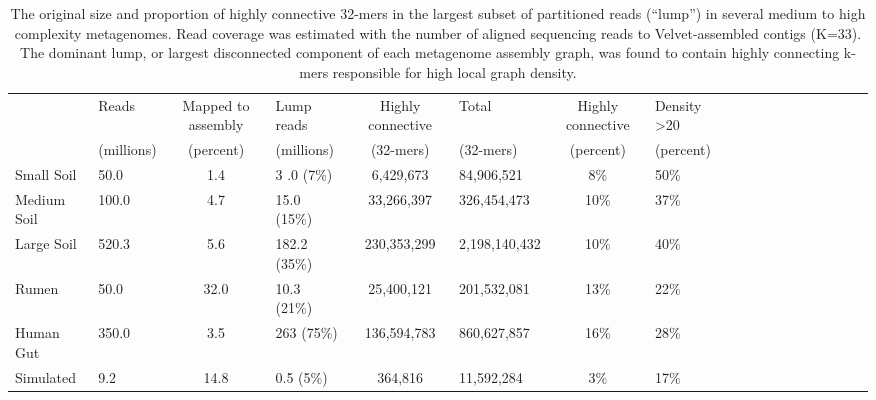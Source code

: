 \documentclass[10pt]{article}
\begin{document}



\pagebreak

\begin{landscape}
\begin{table}[ht]
\centering
\caption{The original size and proportion of highly connective 32-mers in the largest subset of partitioned reads (``lump'') in several medium to high complexity metagenomes.  Read coverage was estimated with the number of aligned sequencing reads to Velvet-assembled contigs (K=33).  The dominant lump, or largest disconnected component of each metagenome assembly graph, was found to contain highly connecting k-mers responsible for high local graph density.}
\begin{tabular}{lp{2cm}cp{2cm}cp{2cm}cp{2cm}cp{2cm}cp{2cm}cp{2cm}cp{2cm}cp{2cm}|}
\hline
& Reads	& Mapped to assembly	& Lump reads	& Highly connective & Total & Highly connective  & Density \textgreater 20  \\
& (millions) & (percent) & (millions) & (32-mers) & (32-mers) & (percent) & (percent) \\

\hline
Small Soil 	& 50.0 	& 1.4 	& 3 .0 (7\%)	& 6,429,673 	& 84,906,521 	& 8\% 	& 50\% \\
Medium Soil 	& 100.0 	& 4.7 	& 15.0 (15\%)	& 33,266,397 	& 326,454,473 & 10\% 	& 37\% \\ 
Large Soil	 	& 520.3 	& 5.6 	& 182.2 (35\%)	& 230,353,299 & 2,198,140,432 & 10\% 	& 40\% \\
Rumen 		& 50.0 	& 32.0 	& 10.3 (21\%)	& 25,400,121 	& 201,532,081 	& 13\% 	& 22\% \\
Human Gut 	& 350.0	& 3.5 	& 263 (75\%) 	& 136,594,783	 & 860,627,857 & 16\% 	& 28\% \\
Simulated		& 9.2		 & 14.8 	& 0.5 (5\%) 	& 364,816 	& 11,592,284 	& 3\% 	& 17\% \\
\hline
\end{tabular}
\end{table}
\end{landscape}
\end{document}
